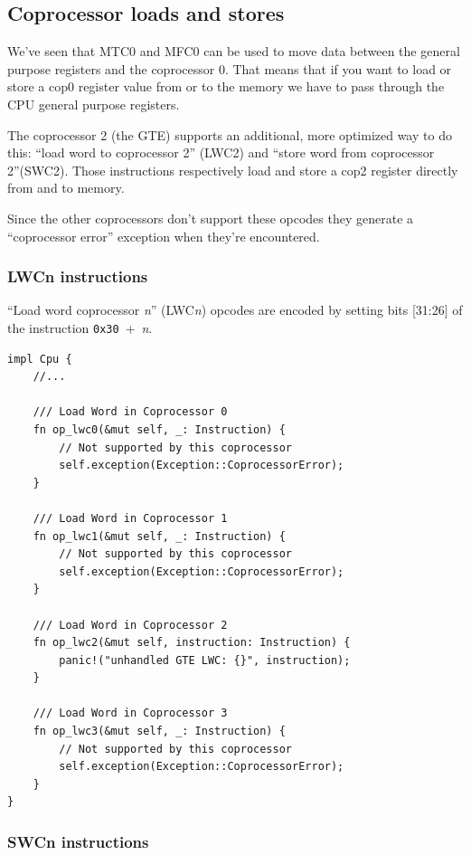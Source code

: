 \documentclass[a4paper]{article}
\newcommand{\code}[1] {\texttt{#1}}
\begin{document}
\subsection{Coprocessor loads and stores}

We've seen that MTC0 and MFC0 can be used to move data between the
general purpose registers and the coprocessor 0. That means that if
you want to load or store a cop0 register value from or to the memory
we have to pass through the CPU general purpose registers.

The coprocessor 2 (the GTE) supports an additional, more optimized way
to do this: ``load word to coprocessor 2'' (LWC2) and ``store word
from coprocessor 2''(SWC2). Those instructions respectively load and
store a cop2 register directly from and to memory.

Since the other coprocessors don't support these opcodes they generate
a ``coprocessor error'' exception when they're encountered.

\subsubsection{LWCn instructions}

``Load word coprocessor \emph{n}'' (LWC\emph{n}) opcodes are encoded
by setting bits [31:26] of the instruction \code{0x30}~+~\emph{n}.

\begin{lstlisting}
impl Cpu {
    //...

    /// Load Word in Coprocessor 0
    fn op_lwc0(&mut self, _: Instruction) {
        // Not supported by this coprocessor
        self.exception(Exception::CoprocessorError);
    }

    /// Load Word in Coprocessor 1
    fn op_lwc1(&mut self, _: Instruction) {
        // Not supported by this coprocessor
        self.exception(Exception::CoprocessorError);
    }

    /// Load Word in Coprocessor 2
    fn op_lwc2(&mut self, instruction: Instruction) {
        panic!("unhandled GTE LWC: {}", instruction);
    }

    /// Load Word in Coprocessor 3
    fn op_lwc3(&mut self, _: Instruction) {
        // Not supported by this coprocessor
        self.exception(Exception::CoprocessorError);
    }
}
\end{lstlisting}

\subsubsection{SWCn instructions}
\end{document}
